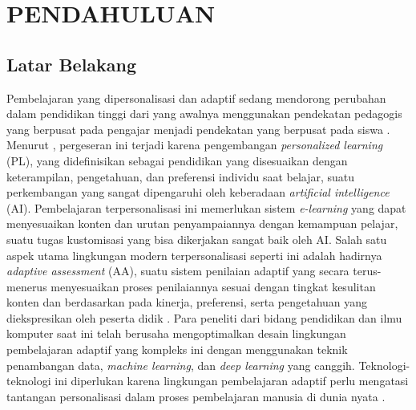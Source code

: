\documentclass[12pt,a4paper,oneside]{book}
\begin{document}
\captionsetup[figure]{labelsep=space}
\captionsetup[table]{labelsep=space}
\captionsetup[lstlisting]{labelsep=space}

\setlength{\parindent}{0pt}
      
\chapter{PENDAHULUAN}

\section{Latar Belakang}
Pembelajaran yang dipersonalisasi dan adaptif sedang mendorong perubahan dalam pendidikan tinggi dari yang awalnya menggunakan pendekatan pedagogis yang berpusat pada pengajar menjadi pendekatan yang berpusat pada siswa \autocite{Ryoo2021}. Menurut \textcite{Halkiopoulos2024}, pergeseran ini terjadi karena pengembangan \textit{personalized learning} (PL), yang didefinisikan sebagai pendidikan yang disesuaikan dengan keterampilan, pengetahuan, dan preferensi individu saat belajar, suatu perkembangan yang sangat dipengaruhi oleh keberadaan \textit{artificial intelligence} (AI). Pembelajaran terpersonalisasi ini memerlukan sistem \textit{e-learning} yang dapat menyesuaikan konten dan urutan penyampaiannya dengan kemampuan pelajar, suatu tugas kustomisasi yang bisa dikerjakan sangat baik oleh AI. Salah satu aspek utama lingkungan modern terpersonalisasi seperti ini adalah hadirnya \textit{adaptive assessment} (AA), suatu sistem penilaian adaptif yang secara terus-menerus menyesuaikan proses penilaiannya sesuai dengan tingkat kesulitan konten dan berdasarkan pada kinerja, preferensi, serta pengetahuan yang diekspresikan oleh peserta didik \autocite{Halkiopoulos2024}. Para peneliti dari bidang pendidikan dan ilmu komputer saat ini telah berusaha mengoptimalkan desain lingkungan pembelajaran adaptif yang kompleks ini dengan menggunakan teknik penambangan data, \textit{machine learning}, dan \textit{deep learning} yang canggih. Teknologi-teknologi ini diperlukan karena lingkungan pembelajaran adaptif perlu mengatasi tantangan personalisasi dalam proses pembelajaran manusia di dunia nyata \autocite{Minn2022}.\\
\end{document}
